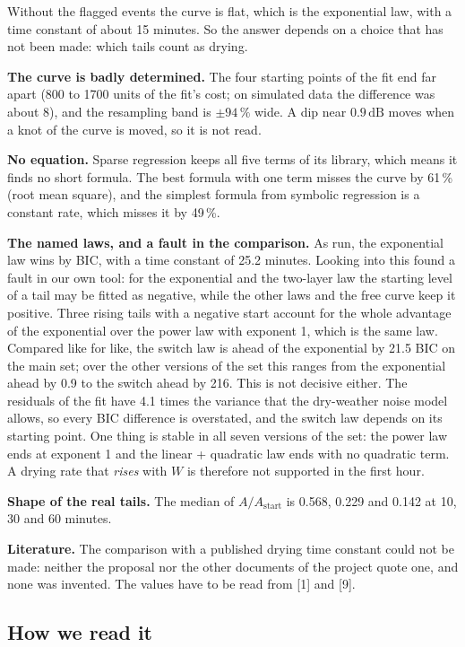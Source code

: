 \documentclass[11pt,a4paper]{article}
\newcommand{\dB}{\,\mathrm{dB}}
\newcommand{\Astart}{A_{\mathrm{start}}}
\begin{document}
Without the flagged events the curve is flat, which is the exponential law, with a time constant of about 15
minutes. So the answer depends on a choice that has not been made: which tails count as drying.

\textbf{The curve is badly determined.} The four starting points of the fit end far apart (800 to 1700 units of the
fit's cost; on simulated data the difference was about 8), and the resampling band is $\pm 94\,\%$ wide. A dip near
$0.9\dB$ moves when a knot of the curve is moved, so it is not read.

\textbf{No equation.} Sparse regression keeps all five terms of its library, which means it finds no short formula.
The best formula with one term misses the curve by 61\,\% (root mean square), and the simplest formula from symbolic
regression is a constant rate, which misses it by 49\,\%.

\textbf{The named laws, and a fault in the comparison.} As run, the exponential law wins by BIC, with a time
constant of 25.2 minutes. Looking into this found a fault in our own tool: for the exponential and the two-layer law
the starting level of a tail may be fitted as negative, while the other laws and the free curve keep it positive.
Three rising tails with a negative start account for the whole advantage of the exponential over the power law with
exponent 1, which is the same law. Compared like for like, the switch law is ahead of the exponential by 21.5 BIC
on the main set; over the other versions of the set this ranges from the exponential ahead by 0.9 to the switch
ahead by 216. This is not decisive either. The residuals of the fit have 4.1 times the variance that the dry-weather
noise model allows, so every BIC difference is overstated, and the switch law depends on its starting point. One
thing is stable in all seven versions of the set: the power law ends at exponent 1 and the linear + quadratic law
ends with no quadratic term. A drying rate that \emph{rises} with $W$ is therefore not supported in the first hour.

\textbf{Shape of the real tails.} The median of $A/\Astart$ is 0.568, 0.229 and 0.142 at 10, 30 and 60 minutes.

\textbf{Literature.} The comparison with a published drying time constant could not be made: neither the proposal
nor the other documents of the project quote one, and none was invented. The values have to be read from [1] and [9].

\subsection{How we read it}
\end{document}
